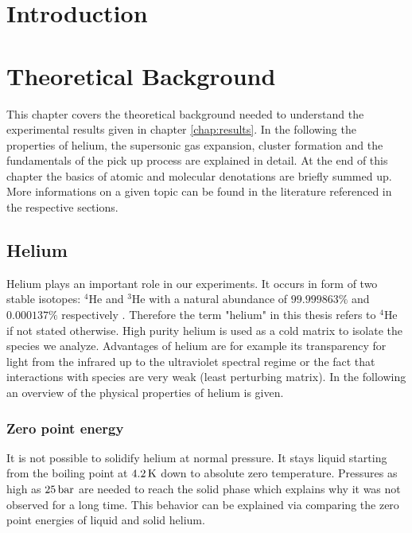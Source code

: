 \documentclass[parskip,12pt,headsepline,a4paper] {scrbook}
\begin{document}


\tableofcontents


\chapter{Introduction}
\setcounter{page}{1}

\chapter{Theoretical Background}
This chapter covers the theoretical background needed to understand the experimental results given in chapter \ref{chap:results}. In the following the properties of helium, the supersonic gas expansion, cluster formation and the fundamentals of the pick up process are explained in detail. At the end of this chapter the basics of atomic and molecular denotations are briefly summed up.
More informations on a given topic can be found in the literature referenced in the respective sections.


\section{Helium}
\vspace{-0.5\baselineskip}
Helium plays an important role in our experiments. It occurs in form of two stable isotopes: $^4$He and $^3$He with a natural abundance of $99.999863 \%$ and $0.000137 \%$ respectively \cite{crc}. Therefore the term "helium" in this thesis refers to $^4$He if not stated otherwise. High purity helium is used as a cold matrix to isolate the species we analyze. Advantages of helium are for example its transparency for light from the infrared up to the ultraviolet spectral regime or the fact that interactions with species are very weak (least perturbing matrix). In the following an overview of the physical properties of helium is given.

\subsection{Zero point energy}
\vspace{-1\baselineskip}
It is not possible to solidify helium at normal pressure. It stays liquid starting from the boiling point at $\unit[4.2]{K}$ down to absolute zero temperature. Pressures as high as $\unit[25]{bar}$ are needed to reach the solid phase which explains why it was not observed for a long time. This behavior can be explained via comparing the zero point energies of liquid and solid helium.
\end{document}
